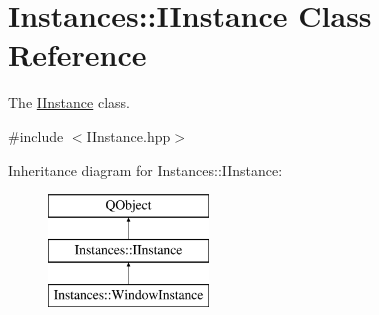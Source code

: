 \hypertarget{classInstances_1_1IInstance}{\section{Instances\+:\+:I\+Instance Class Reference}
\label{classInstances_1_1IInstance}
}


The \hyperlink{classInstances_1_1IInstance}{I\+Instance} class.  




{\ttfamily \#include $<$I\+Instance.\+hpp$>$}

Inheritance diagram for Instances\+:\+:I\+Instance\+:\begin{figure}[H]
\begin{center}
\leavevmode
\includegraphics[height=3.000000cm]{classInstances_1_1IInstance}
\end{center}
\end{figure}
